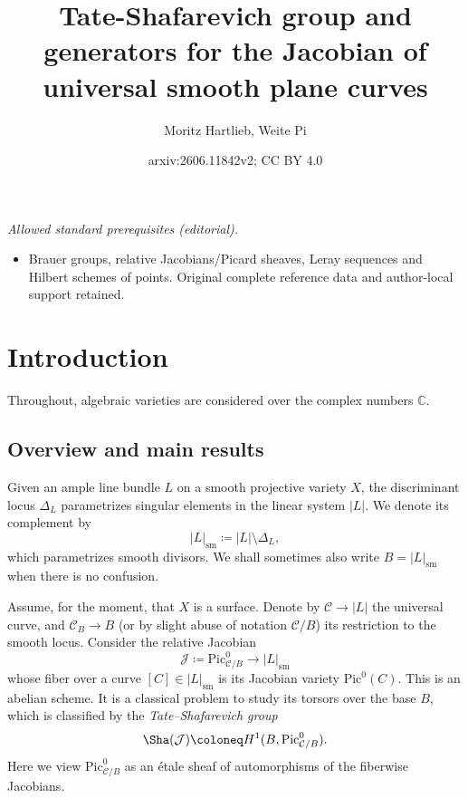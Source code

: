 \documentclass[11pt]{amsart}
\title{Tate-Shafarevich group and generators for the Jacobian of universal smooth plane curves}
\author{Moritz Hartlieb, Weite Pi}
\date{arxiv:2606.11842v2; CC BY 4.0}
\theoremstyle{plain}
\theoremstyle{definition}
\theoremstyle{remark}
\newcommand{\Pic}{\mathop{\rm Pic}\nolimits}
\begin{document}
\maketitle
\noindent\textit{Allowed standard prerequisites (editorial).}\begin{itemize}
\item Brauer groups, relative Jacobians/Picard sheaves, Leray sequences and Hilbert schemes of points. Original complete reference data and author-local support retained.
\end{itemize}\medskip
\newcommand\blfootnote[1]{%
  \begingroup
  \renewcommand\thefootnote{}\footnote{#1}%
  \addtocounter{footnote}{-1}%
  \endgroup
}

\section{Introduction}

Throughout, algebraic varieties are considered over the complex numbers $\mathbb C$.

\subsection{Overview and main results} Given an ample line bundle $L$ on a smooth projective variety $X$, the discriminant locus $\Delta_L$ parametrizes singular elements in the linear system $|L|$. We denote its complement by
\[
|L|_\mathrm{sm} \coloneq |L| \setminus \Delta_L,
\]
which parametrizes smooth divisors. We shall sometimes also write $B = |L|_\mathrm{sm}$ when there is no confusion.

Assume, for the moment, that $X$ is a surface. Denote by $\mathcal{C} \to |L|$ the universal curve, and $\mathcal{C}_B \to B$ (or by slight abuse of notation $\mathcal{C}/B$) its restriction to the smooth locus. Consider the relative Jacobian
\[
\mathcal{J} \coloneq \mathrm{Pic}^0_{\mathcal{C}/B} \to |L|_\mathrm{sm}
\]
whose fiber over a curve $[C]\in |L|_\mathrm{sm}$ is its Jacobian variety $\mathrm{Pic}^0(C)$. This is an abelian scheme. It is a classical problem to study its torsors over the base $B$, which is classified by the \textit{Tate--Shafarevich group}
\[
\Sha(\mathcal{J}) \coloneq H^1(B, \Pic^0_{\mathcal C / B}).
\]
Here we view $\mathrm{Pic}^0_{\mathcal{C}/B}$ as an étale sheaf of automorphisms of the fiberwise Jacobians.

\smallskip
\end{document}
